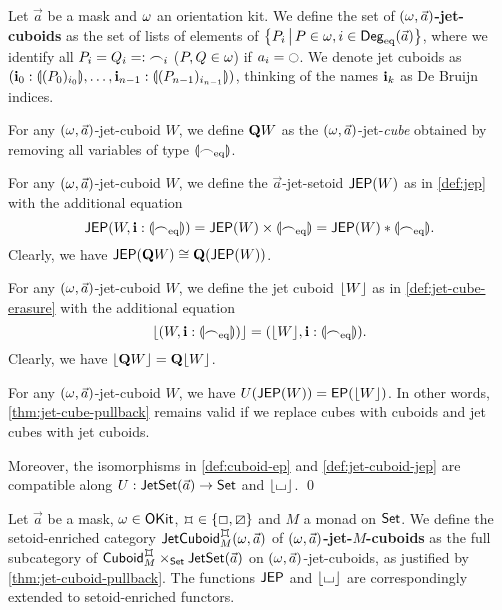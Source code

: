 \documentclass[a4paper]{memoir}
\begin{document}
\begin{definition}
	\label{def:jet-cuboid}
	Let $\vec a$ be a mask and $\omega$ an orientation kit.
	We define the set of \textbf{$(\omega, \vec{a})$-jet-cuboids} as the set of lists of elements of $\mathopen{}\left\{ P_i \,\middle|\, P \in \omega, i \in {\mathsf{Deg}_{\mathrm{eq}}}(\vec a) \right\}\mathclose{}$,
	where we identify all $P_i = Q_i =: {\frown}_i$ ($P, Q \in \omega$) if $a_i = \npolar$.
	We denote jet cuboids as
	$(\mathbf{i}_0 : {\llparenthesis (P_0)_{i_0} \rrparenthesis}, \ldots, \mathbf{i}_{n-1} : {\llparenthesis (P_{n-1})_{i_{n-1}} \rrparenthesis})$,
	thinking of the names $\mathbf{i}_k$ as De Bruijn indices.
	
	For any $(\omega, \vec a)$-jet-cuboid $W$, we define ${\mathbf{Q}} W$ as the $(\omega, \vec a)$-jet-\emph{cube} obtained by removing all variables of type ${\llparenthesis {\frown}_{\mathrm{eq}} \rrparenthesis}$.
\end{definition}
\begin{definition} \label{def:jet-cuboid-jep}
	For any $(\omega, \vec a)$-jet-cuboid $W$, we define the $\vec a$-jet-setoid $\mathsf{JEP}(W)$ as in \cref{def:jep} with the additional equation
	\[
		\mathsf{JEP}(W, \mathbf{i} : {\llparenthesis {\frown}_{\mathrm{eq}} \rrparenthesis}) = \mathsf{JEP}(W) \times {\llparenthesis {\frown}_{\mathrm{eq}}\rrparenthesis} = \mathsf{JEP}(W) * {\llparenthesis {\frown}_{\mathrm{eq}} \rrparenthesis}.
	\]
	Clearly, we have $\mathsf{JEP}({\mathbf{Q}} W) \cong {\mathbf{Q}}(\mathsf{JEP}(W))$.
\end{definition}
\begin{definition} \label{def:jet-cuboid-erasure}
	For any $(\omega, \vec a)$-jet-cuboid $W$, we define the jet cuboid $\mathopen{}\left\lfloor W \right\rfloor\mathclose{}$ as in \cref{def:jet-cube-erasure} with the additional equation
	\[
		\mathopen{}\left\lfloor (W, \mathbf{i} : {\llparenthesis {\frown}_{\mathrm{eq}} \rrparenthesis}) \right\rfloor\mathclose{} = (\mathopen{}\left\lfloor W \right\rfloor\mathclose{}, \mathbf{i} : {\llparenthesis {\frown}_{\mathrm{eq}} \rrparenthesis}).
	\]
	Clearly, we have $\mathopen{}\left\lfloor {\mathbf{Q}} W \right\rfloor\mathclose{} = {\mathbf{Q}}{\mathopen{}\left\lfloor W \right\rfloor\mathclose{}}$.
\end{definition}
\begin{corollary} \label{thm:jet-cuboid-pullback}
	For any $(\omega, \vec a)$-jet-cuboid $W$, we have $U(\mathsf{JEP}(W)) = \mathsf{EP}(\mathopen{}\left\lfloor W \right\rfloor\mathclose{})$.
	In other words, \cref{thm:jet-cube-pullback} remains valid if we replace cubes with cuboids and jet cubes with jet cuboids.
	
	Moreover, the isomorphisms in \cref{def:cuboid-ep} and \cref{def:jet-cuboid-jep} are compatible along $U : \mathsf{JetSet}(\vec a) \to {\mathsf{Set}}$ and $\mathopen{}\left\lfloor {\llcorner\hspace{-.4ex}\lrcorner} \right\rfloor\mathclose{}$. \qed
\end{corollary}
\begin{definition} \label{def:jet-cuboid-cat}
	Let $\vec a$ be a mask, $\omega \in {\mathsf{OKit}}$, $\mycubex \in \accol{\affine, \cartes}$ and $M$ a monad on ${\mathsf{Set}}$.
	We define
	the setoid-enriched category $\jetcuboid{\myorix}{\mycubex}{M}{\vec a}$ of \textbf{$(\omega, \vec a)$-jet-$M$-cuboids}
	as the full subcategory of $\cuboidcat^\mycubex_M \times_\Set \jetset{\vec a}$ on $(\omega, \vec a)$-jet-cuboids, as justified by \cref{thm:jet-cuboid-pullback}.
	The functions $\mathsf{JEP}$ and $\mathopen{}\left\lfloor {\llcorner\hspace{-.4ex}\lrcorner} \right\rfloor\mathclose{}$ are correspondingly extended to setoid-enriched functors.
\end{definition}
\end{document}
